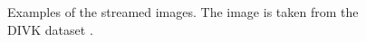 \begin{figure}[htbp]%
    \centering
    \qquad
    \caption{Examples of the streamed images. The image is taken from the DIVK dataset \parencite{Agustsson2017}.}%
    \label{fig:examplestream}%
\end{figure}

